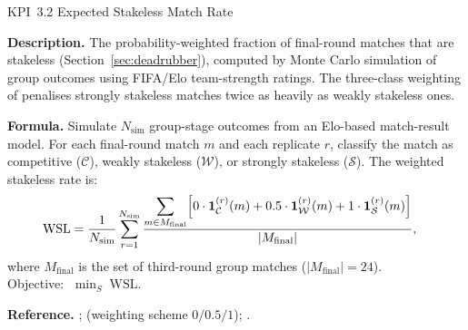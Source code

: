 \documentclass[12pt, letterpaper]{article}
\newcommand{\kpilabel}[1]{\noindent\textbf{#1}\enspace}
\begin{document}
\begin{kpibox}{KPI~3.2 \textendash{} Expected Stakeless Match Rate}

\kpilabel{Description.}
The probability-weighted fraction of final-round matches that are
stakeless (Section~\ref{sec:deadrubber}), computed by Monte Carlo
simulation of group outcomes using FIFA/Elo team-strength ratings.
The three-class weighting of \citet{CsatoGyimesi2025} penalises strongly
stakeless matches twice as heavily as weakly stakeless ones.

\medskip
\kpilabel{Formula.}
Simulate $N_{\mathrm{sim}}$ group-stage outcomes from an Elo-based
match-result model.  For each final-round match $m$ and each
replicate $r$, classify the match as competitive ($\mathcal{C}$),
weakly stakeless ($\mathcal{W}$), or strongly stakeless ($\mathcal{S}$).
The weighted stakeless rate is:
\begin{align*}
  \mathrm{WSL} &= \frac{1}{N_{\mathrm{sim}}}
    \sum_{r=1}^{N_{\mathrm{sim}}}
    \frac{\displaystyle\sum_{m \in M_{\mathrm{final}}}
      \Bigl[
        0 \cdot \mathbf{1}_{\mathcal{C}}^{(r)}(m)
        + 0.5 \cdot \mathbf{1}_{\mathcal{W}}^{(r)}(m)
        + 1 \cdot \mathbf{1}_{\mathcal{S}}^{(r)}(m)
      \Bigr]}
    {|M_{\mathrm{final}}|},
\end{align*}
where $M_{\mathrm{final}}$ is the set of third-round group matches
($|M_{\mathrm{final}}| = 24$).\\[4pt]
Objective: $\;\displaystyle\min_{S}\;\mathrm{WSL}$.

\medskip
\kpilabel{Reference.}
\citet{CsatoEtAl2024}; \citet{CsatoGyimesi2025} (weighting scheme
$0/0.5/1$); \citet{GuajardoKrumer2024}.
\end{kpibox}
\end{document}
